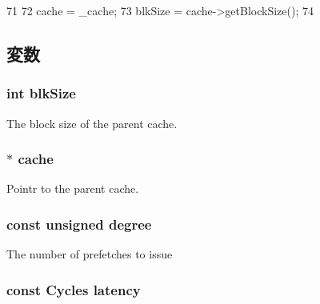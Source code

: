 \begin{DoxyCode}
71 {
72     cache = _cache;
73     blkSize = cache->getBlockSize();
74 }
\end{DoxyCode}


\subsection{変数}
\hypertarget{classBasePrefetcher_a848be51480be2b992d8a262952268fbc}{
\subsubsection[{blkSize}]{\setlength{\rightskip}{0pt plus 5cm}int {\bf blkSize}}}
\label{classBasePrefetcher_a848be51480be2b992d8a262952268fbc}
The block size of the parent cache. \hypertarget{classBasePrefetcher_a5cc08dee7231c774489c04728dd5f169}{
\subsubsection[{cache}]{$\ast$ {\bf cache}}}
\label{classBasePrefetcher_a5cc08dee7231c774489c04728dd5f169}
Pointr to the parent cache. \hypertarget{classBasePrefetcher_aa05c9c27f3c02725fb1574fb5218aeba}{
\subsubsection[{degree}]{\setlength{\rightskip}{0pt plus 5cm}const unsigned {\bf degree}}}
\label{classBasePrefetcher_aa05c9c27f3c02725fb1574fb5218aeba}
The number of prefetches to issue \hypertarget{classBasePrefetcher_a46b9d67ee437c6ecdbedca8ec8d2ed40}{
\subsubsection[{latency}]{\setlength{\rightskip}{0pt plus 5cm}const {\bf Cycles} {\bf latency}}}

